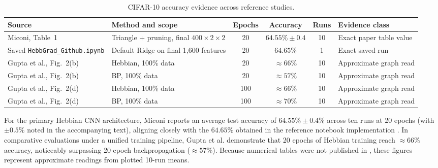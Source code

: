 \documentclass{article}
\begin{document}
    \begin{table}[t]
    \centering
    \footnotesize
    \setlength{\tabcolsep}{4pt}
    \renewcommand{\arraystretch}{1.2}
    \caption{CIFAR-10 accuracy evidence across reference studies.}
    \label{tab:accuracy_evidence}
    \begin{tabularx}{\textwidth}{
      >{\hsize=1.05\hsize\raggedright\arraybackslash}X
      >{\hsize=0.90\hsize\raggedright\arraybackslash}X
      c
      c
      c
      >{\hsize=1.05\hsize\raggedright\arraybackslash}X
    }
    \toprule
    Source & Method and scope & Epochs & Accuracy & Runs & Evidence class \\
    \midrule
    Miconi, Table~1 \citep{miconi2021hebbian} & Triangle + pruning, final $400\times 2\times 2$ & 20 & $64.55\% \pm 0.4$ & 10 & Exact paper table value \\
    \addlinespace
    Saved \texttt{HebbGrad\_\allowbreak Github.\allowbreak ipynb} \citep{miconi2021repo} & Default Ridge on final 1,600 features & 20 & $64.65\%$ & 1 & Exact saved run \\
    \addlinespace
    Gupta et al., Fig.~2(b) \citep{gupta2023bio} & Hebbian, 100\% data                       & 20 & $\approx 66\%$    & 10 & Approximate graph read \\
    Gupta et al., Fig.~2(b) \citep{gupta2023bio} & BP, 100\% data                            & 20 & $\approx 57\%$    & 10 & Approximate graph read \\
    \addlinespace
    Gupta et al., Fig.~2(d) \citep{gupta2023bio} & Hebbian, 100\% data                       & 100 & $\approx 66\%$   & 10 & Approximate graph read \\
    Gupta et al., Fig.~2(d) \citep{gupta2023bio} & BP, 100\% data                            & 100 & $\approx 70\%$   & 10 & Approximate graph read \\
    \bottomrule
    \end{tabularx}
    \end{table}
    
    For the primary Hebbian CNN architecture, Miconi \citep{miconi2021hebbian} reports an average test accuracy of $64.55\% \pm 0.4\%$ across ten runs at 20 epochs (with $\pm 0.5\%$ noted in the accompanying text), aligning closely with the $64.65\%$ obtained in the reference notebook implementation \citep{miconi2021repo}. In comparative evaluations under a unified training pipeline, Gupta et al. \citep{gupta2023bio} demonstrate that 20 epochs of Hebbian training reach $\approx 66\%$ accuracy, noticeably surpassing 20-epoch backpropagation ($\approx 57\%$). Because numerical tables were not published in \citep{gupta2023bio}, these figures represent approximate readings from plotted 10-run means.
    
\end{document}
